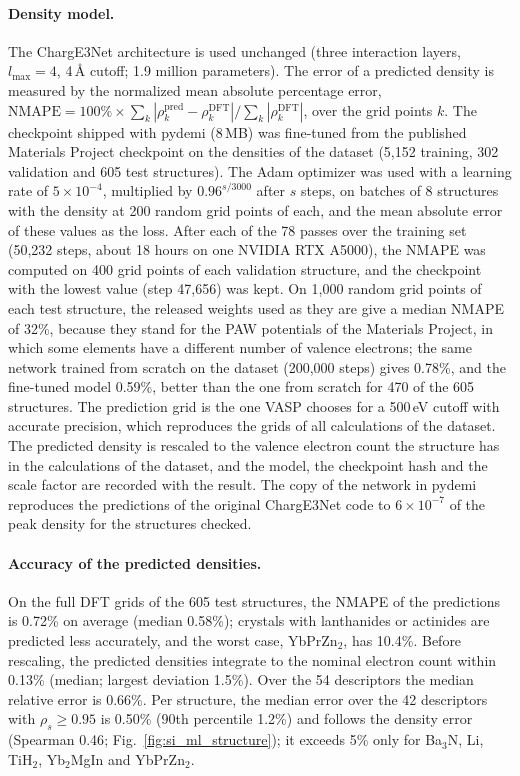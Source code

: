 \documentclass[journal=jctcce,manuscript=suppinfo,email=true]{achemso}
\newcommand{\rev}[1]{{\color{blue}#1}}
\begin{document}
\paragraph{Density model.} The ChargE3Net architecture is used unchanged
(three interaction layers, $l_{\max}=4$, 4\,\AA{} cutoff; 1.9 million
parameters). The error of a predicted density is measured by the normalized
mean absolute percentage error,
$\mathrm{NMAPE}=100\%\times\sum_k|\rho_k^\mathrm{pred}-\rho_k^\mathrm{DFT}|/\sum_k|\rho_k^\mathrm{DFT}|$,
over the grid points $k$. The checkpoint shipped with pydemi (8\,MB) was
fine-tuned from the published Materials Project checkpoint on the densities of
the dataset (5,152 training, 302 validation and 605 test structures). The
Adam optimizer was used with a learning rate of $5\times10^{-4}$, multiplied by
$0.96^{s/3000}$ after $s$ steps, on batches of 8 structures with the density at
200 random grid points of each, and the mean absolute error of these values as
the loss. After each of the 78 passes over the training set (50,232 steps, about
18 hours on one NVIDIA RTX A5000), the NMAPE was computed on 400 grid points of
each validation structure, and the checkpoint with the lowest value (step
47,656) was kept. On 1,000 random grid points of each test structure, the
released weights used as they are give a median NMAPE of 32\%, because \rev{they
stand for the PAW potentials of the Materials Project, in which some elements
have a different number of valence electrons}; the same network trained from scratch on the dataset
(200,000 steps) gives 0.78\%, and the fine-tuned model 0.59\%, better than the
one from scratch for 470 of the 605 structures. The prediction grid is the
one VASP chooses for a 500\,eV cutoff with accurate precision, which reproduces
the grids of all calculations of the dataset. The predicted density is rescaled
to the valence electron count \rev{the structure has in the calculations of the
dataset}, and the model, the checkpoint hash and the scale factor are recorded
with the result. The copy of the network in pydemi reproduces the
predictions of the original ChargE3Net code to $6\times10^{-7}$ of the peak
density for the structures checked.

\paragraph{Accuracy of the predicted densities.} On the full DFT grids of the
605 test structures, the NMAPE of
the predictions is 0.72\% on average (median 0.58\%); crystals with lanthanides
or actinides are predicted less accurately, and the worst case, YbPrZn$_2$, has
10.4\%. Before rescaling, the predicted densities integrate to the nominal
electron count within 0.13\% (median; largest deviation 1.5\%). Over the \rev{54} descriptors the median
relative error is 0.66\%. Per structure, the median error over the \rev{42}
descriptors with $\rho_s\geq0.95$ is \rev{0.50\%} (90th percentile 1.2\%) and follows the
density error (Spearman \rev{0.46}; Fig.~\ref{fig:si_ml_structure}); it exceeds 5\%
only for Ba$_3$N, Li, TiH$_2$, Yb$_2$MgIn and YbPrZn$_2$.
\end{document}
